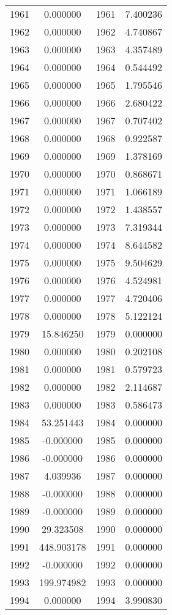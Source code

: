 \documentclass[12pt]{article}
\begin{document}
\begin{longtable}{@{}cccc@{}}
1961 & 0.000000 & 1961 & 7.400236 \\
1962 & 0.000000 & 1962 & 4.740867 \\
1963 & 0.000000 & 1963 & 4.357489 \\
1964 & 0.000000 & 1964 & 0.544492 \\
1965 & 0.000000 & 1965 & 1.795546 \\
1966 & 0.000000 & 1966 & 2.680422 \\
1967 & 0.000000 & 1967 & 0.707402 \\
1968 & 0.000000 & 1968 & 0.922587 \\
1969 & 0.000000 & 1969 & 1.378169 \\
1970 & 0.000000 & 1970 & 0.868671 \\
1971 & 0.000000 & 1971 & 1.066189 \\
1972 & 0.000000 & 1972 & 1.438557 \\
1973 & 0.000000 & 1973 & 7.319344 \\
1974 & 0.000000 & 1974 & 8.644582 \\
1975 & 0.000000 & 1975 & 9.504629 \\
1976 & 0.000000 & 1976 & 4.524981 \\
1977 & 0.000000 & 1977 & 4.720406 \\
1978 & 0.000000 & 1978 & 5.122124 \\
1979 & 15.846250 & 1979 & 0.000000 \\
1980 & 0.000000 & 1980 & 0.202108 \\
1981 & 0.000000 & 1981 & 0.579723 \\
1982 & 0.000000 & 1982 & 2.114687 \\
1983 & 0.000000 & 1983 & 0.586473 \\
1984 & 53.251443 & 1984 & 0.000000 \\
1985 & -0.000000 & 1985 & 0.000000 \\
1986 & -0.000000 & 1986 & 0.000000 \\
1987 & 4.039936 & 1987 & 0.000000 \\
1988 & -0.000000 & 1988 & 0.000000 \\
1989 & -0.000000 & 1989 & 0.000000 \\
1990 & 29.323508 & 1990 & 0.000000 \\
1991 & 448.903178 & 1991 & 0.000000 \\
1992 & -0.000000 & 1992 & 0.000000 \\
1993 & 199.974982 & 1993 & 0.000000 \\
1994 & 0.000000 & 1994 & 3.990830 \\

\end{longtable}
\end{document}
